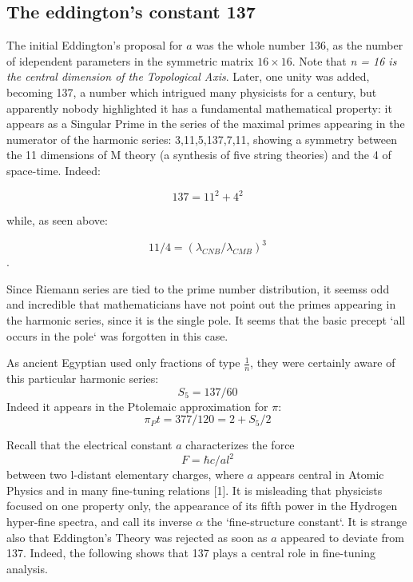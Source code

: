 \documentclass[twoside,draft]{article}
\begin{document}
\begin{sloppypar}
{\subsection{The eddington's constant 137}

The initial Eddington's proposal for $a$ was the whole number 136, as the number of idependent parameters in the symmetric matrix $16 \times 16$. Note that \textit{n = 16 is the central dimension of the Topological Axis}. Later, one unity was added, becoming 137, a number which intrigued many physicists for a century, but apparently nobody highlighted it has a fundamental mathematical property: it appears as a Singular Prime in the series of the maximal primes appearing in the numerator of the harmonic
series: 3,11,5,137,7,11, showing a symmetry between the 11 dimensions of M theory (a synthesis of five string theories) and the 4 of space-time. Indeed:

$$137 = 11^{2} + 4^{2}$$

while, as seen above:

$$11/4 = (\lambda_{CNB}/\lambda_{CMB})^{3}$$.

Since Riemann series are tied to the prime number distribution, it seemss odd and incredible that mathematicians
have not point out the primes appearing in the harmonic series, since it is the single pole. It seems
that the basic precept `all occurs in the pole` was forgotten in this case. 

As ancient Egyptian used only fractions of type $\frac{1}{n}$, they were certainly aware of this particular harmonic series: 
$$S_{5} = 137/60$$
Indeed it appears in the Ptolemaic approximation for $\pi$: $$\pi_Pt = 377/120 = 2 +  S_{5}/2$$

Recall that the electrical constant $a$ characterizes the force $$F =\hbar c/al^{2}$$ between two l-distant
elementary charges, where $a$ appears central in Atomic Physics and in many fine-tuning relations [1]. It is
misleading that physicists focused on one property only, the appearance of its fifth power in the
Hydrogen hyper-fine spectra, and call its inverse $\alpha$ the `fine-structure constant`. It is strange also that
Eddington's Theory was rejected as soon as $a$ appeared to deviate from 137. Indeed, the
following shows that 137 plays a central role in fine-tuning analysis. 

}
\end{sloppypar}
\end{document}
